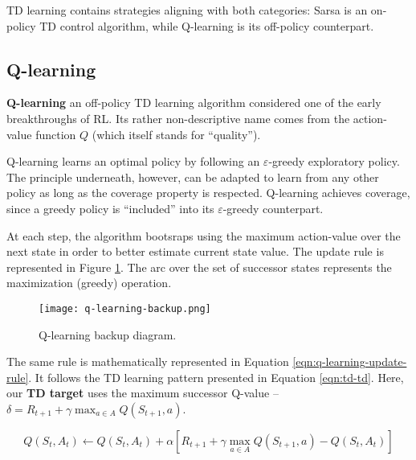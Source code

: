 
TD learning contains strategies aligning with both categories: Sarsa is an on-policy TD control algorithm, while Q-learning is its off-policy counterpart.

\subsection{Q-learning} \label{rl:q-learning}
\textbf{Q-learning} \cite{Watkins1992} an off-policy TD learning algorithm considered one of the early breakthroughs of RL.
Its rather non-descriptive name comes from the action-value function $Q$ (which itself stands for ``quality'').

Q-learning learns an optimal policy by following an $\varepsilon$-greedy exploratory policy.
The principle underneath, however, can be adapted to learn from any other policy as long as the coverage property is respected.
Q-learning achieves coverage, since a greedy policy is ``included'' into its $\varepsilon$-greedy counterpart.

At each step, the algorithm bootsraps using the maximum action-value over the next state in order to better estimate current state value.
The update rule is represented in Figure \ref{fig:q-learning-backup}.
The arc over the set of successor states represents the maximization (greedy) operation.

\begin{figure}[h]
    \centering
    \texttt{[image: q-learning-backup.png]}
    \caption{Q-learning backup diagram.}
    \label{fig:q-learning-backup}
\end{figure}

The same rule is mathematically represented in Equation \ref{eqn:q-learning-update-rule}.
It follows the TD learning pattern presented in Equation \ref{eqn:td-td}. Here, our \textbf{TD target} uses the maximum successor Q-value -- $\delta = R_{t+1} + \gamma \max_{a \in A}{Q(S_{t+1}, a)}$.


\begin{equation} \label{eqn:q-learning-update-rule}
    Q(S_t, A_t) \leftarrow Q(S_t, A_t) + \alpha [
        R_{t+1} + \gamma \max_{a \in A}{Q(S_{t+1}, a)} - Q(S_t, A_t)
    ]
\end{equation}
 
\pagebreak